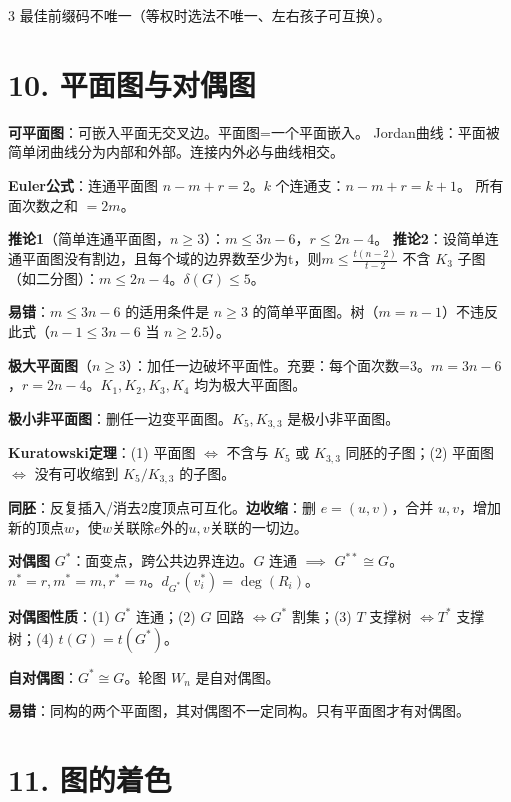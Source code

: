 \documentclass[10pt,a4paper,landscape]{ctexart}
\begin{document}
\begin{multicols}{3}
最佳前缀码不唯一（等权时选法不唯一、左右孩子可互换）。

\section*{10. 平面图与对偶图}

\textbf{可平面图}：可嵌入平面无交叉边。平面图=一个平面嵌入。
Jordan曲线：平面被简单闭曲线分为内部和外部。连接内外必与曲线相交。

\textbf{Euler公式}：连通平面图 $n-m+r=2$。$k$ 个连通支：$n-m+r=k+1$。
所有面次数之和 $=2m$。

\textbf{推论1}（简单连通平面图，$n\geq 3$）：$m\leq 3n-6$，$r\leq 2n-4$。
\textbf{推论2}：设简单连通平面图没有割边，且每个域的边界数至少为t，则$m \leq \frac{t(n -2)}{t - 2}$
不含 $K_3$ 子图（如二分图）：$m\leq 2n-4$。\textbf{$\delta(G)\leq 5$}。

\textbf{易错}：$m\leq 3n-6$ 的适用条件是 $n\geq 3$ 的简单平面图。树（$m=n-1$）不违反此式（$n-1\leq 3n-6$ 当 $n\geq 2.5$）。

\textbf{极大平面图}（$n\geq 3$）：加任一边破坏平面性。充要：每个面次数=3。$m=3n-6$，$r=2n-4$。$K_1,K_2,K_3,K_4$ 均为极大平面图。

\textbf{极小非平面图}：删任一边变平面图。$K_5,K_{3,3}$ 是极小非平面图。

\textbf{Kuratowski定理}：(1) 平面图 $\iff$ 不含与 $K_5$ 或 $K_{3,3}$ 同胚的子图；(2) 平面图 $\iff$ 没有可收缩到 $K_5/K_{3,3}$ 的子图。

\textbf{同胚}：反复插入/消去2度顶点可互化。\textbf{边收缩}：删 $e=(u,v)$，合并 $u,v$，增加新的顶点$w$，使$w$关联除$e$外的$u, v$关联的一切边。

\textbf{对偶图} $G^*$：面变点，跨公共边界连边。$G$ 连通 $\implies$ $G^{**}\cong G$。$n^*=r,m^*=m,r^*=n$。$d_{G^*}(v_i^*)=\deg(R_i)$。

\textbf{对偶图性质}：(1) $G^*$ 连通；(2) $G$ 回路 $\iff G^*$ 割集；(3) $T$ 支撑树 $\iff T^*$ 支撑树；(4) $t(G)=t(G^*)$。

\textbf{自对偶图}：$G^*\cong G$。轮图 $W_n$ 是自对偶图。

\textbf{易错}：同构的两个平面图，其对偶图不一定同构。只有平面图才有对偶图。

\section*{11. 图的着色}


\end{multicols}
\end{document}
